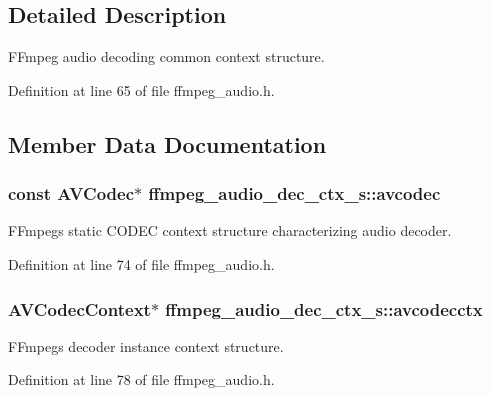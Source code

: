 \subsection{Detailed Description}
F\+Fmpeg audio decoding common context structure. 

Definition at line 65 of file ffmpeg\+\_\+audio.\+h.



\subsection{Member Data Documentation}
\subsubsection[{\texorpdfstring{avcodec}{avcodec}}]{\setlength{\rightskip}{0pt plus 5cm}const A\+V\+Codec$\ast$ ffmpeg\+\_\+audio\+\_\+dec\+\_\+ctx\+\_\+s\+::avcodec}\hypertarget{structffmpeg__audio__dec__ctx__s_a8a73d6d4be6d11d6b1748cd5de5809b1}{}\label{structffmpeg__audio__dec__ctx__s_a8a73d6d4be6d11d6b1748cd5de5809b1}
F\+Fmpeg\textquotesingle{}s static C\+O\+D\+EC context structure characterizing audio decoder. 

Definition at line 74 of file ffmpeg\+\_\+audio.\+h.

\subsubsection[{\texorpdfstring{avcodecctx}{avcodecctx}}]{\setlength{\rightskip}{0pt plus 5cm}A\+V\+Codec\+Context$\ast$ ffmpeg\+\_\+audio\+\_\+dec\+\_\+ctx\+\_\+s\+::avcodecctx}\hypertarget{structffmpeg__audio__dec__ctx__s_a0eacb15c64cb86d241a420b859d12e78}{}\label{structffmpeg__audio__dec__ctx__s_a0eacb15c64cb86d241a420b859d12e78}
F\+Fmpeg\textquotesingle{}s decoder instance context structure. 

Definition at line 78 of file ffmpeg\+\_\+audio.\+h.


